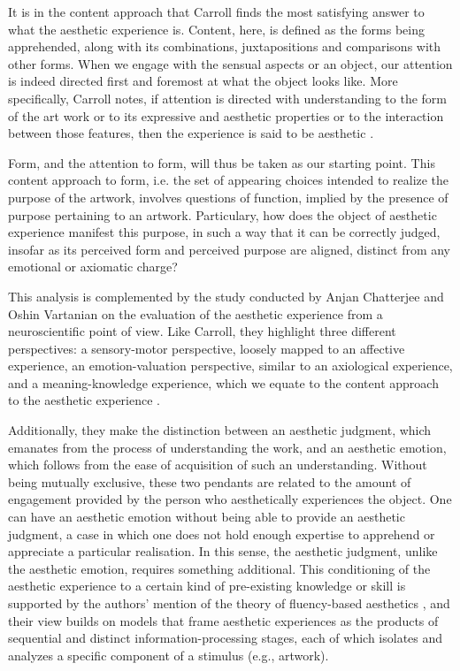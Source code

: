 It is in the content approach that Carroll finds the most satisfying answer to what the aesthetic experience is. Content, here, is defined as the forms being apprehended, along with its combinations, juxtapositions and comparisons with other forms. When we engage with the sensual aspects or an object, our attention is indeed directed first and foremost at what the object looks like. More specifically, Carroll notes, if attention is directed with understanding to the form of the art work or to its expressive and aesthetic properties or to the interaction between those features, then the experience is said to be aesthetic \citep{carroll_aesthetic_2002}.

Form, and the attention to form, will thus be taken as our starting point.  This content approach to form, i.e. the set of appearing choices intended to realize the purpose of the artwork, involves questions of function, implied by the presence of purpose pertaining to an artwork. Particulary, how does the object of aesthetic experience manifest this purpose, in such a way that it can be correctly judged, insofar as its perceived form and perceived purpose are aligned, distinct from any emotional or axiomatic charge?

This analysis is complemented by the study conducted by Anjan Chatterjee and Oshin Vartanian on the evaluation of the aesthetic experience from a neuroscientific point of view. Like Carroll, they highlight three different perspectives: a sensory-motor perspective, loosely mapped to an affective experience, an emotion-valuation perspective, similar to an axiological experience, and a meaning-knowledge experience, which we equate to the content approach to the aesthetic experience \citep{chatterjee_neuroscience_2016}.

Additionally, they make the distinction between an aesthetic judgment, which emanates from the process of understanding the work, and an aesthetic emotion, which follows from the ease of acquisition of such an understanding. Without being mutually exclusive, these two pendants are related to the amount of engagement provided by the person who aesthetically experiences the object. One can have an aesthetic emotion without being able to provide an aesthetic judgment, a case in which one does not hold enough expertise to apprehend or appreciate a particular realisation. In this sense, the aesthetic judgment, unlike the aesthetic emotion, requires something additional. This conditioning of the aesthetic experience to a certain kind of pre-existing knowledge or skill is supported by the authors' mention of the theory of fluency-based aesthetics \citep{chatterjee_neuroscience_2016}, and their view builds on models that frame aesthetic experiences as the products of sequential and distinct information-processing stages, each of which isolates and analyzes a specific component of a stimulus (e.g., artwork).

